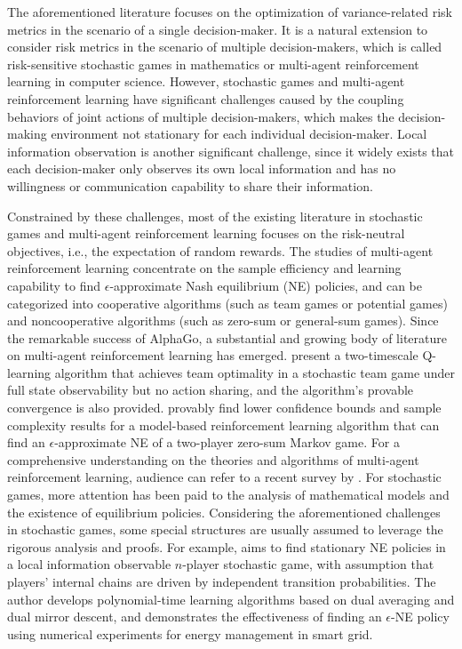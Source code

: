 \documentclass[12pt]{article}
\begin{document}
The aforementioned literature focuses on the optimization of
variance-related risk metrics in the scenario of a single
decision-maker. It is a natural extension to consider risk metrics
in the scenario of multiple decision-makers, which is called
risk-sensitive stochastic games in mathematics or multi-agent
reinforcement learning in computer science. However, stochastic
games and multi-agent reinforcement learning have significant
challenges caused by the coupling behaviors of joint actions of
multiple decision-makers, which makes the decision-making
environment not stationary for each individual decision-maker. Local
information observation is another significant challenge, since it
widely exists that each decision-maker only observes its own local
information and has no willingness or communication capability to
share their information.


Constrained by these challenges, most of the existing literature in
stochastic games and multi-agent reinforcement learning focuses on
the risk-neutral objectives, i.e., the expectation of random
rewards. The studies of multi-agent reinforcement learning
concentrate on the sample efficiency and learning capability to find
$\epsilon$-approximate Nash equilibrium (NE) policies, and can be
categorized into cooperative algorithms (such as team games or
potential games) and noncooperative algorithms (such as zero-sum or
general-sum games). Since the remarkable success of AlphaGo, a
substantial and growing body of literature on multi-agent
reinforcement learning has emerged. \cite{Yongacoglu21} present a
two-timescale Q-learning algorithm that achieves team optimality in
a stochastic team game under full state observability but no action
sharing, and the algorithm's provable convergence is also provided.
\cite{Yan24} provably find lower confidence bounds and sample
complexity results for a model-based reinforcement learning
algorithm that can find an $\epsilon$-approximate NE of a two-player
zero-sum Markov game. For a comprehensive understanding on the
theories and algorithms of multi-agent reinforcement learning,
audience can refer to a recent survey by \cite{Zhang21}. For
stochastic games, more attention has been paid to the analysis of
mathematical models and the existence of equilibrium policies.
Considering the aforementioned challenges in stochastic games, some
special structures are usually assumed to leverage the rigorous
analysis and proofs. For example, \cite{Etesami24} aims to find
stationary NE policies in a local information observable $n$-player
stochastic game, with assumption that players' internal chains are
driven by independent transition probabilities. The author develops
polynomial-time learning algorithms based on dual averaging and dual
mirror descent, and demonstrates the effectiveness of finding an
$\epsilon$-NE policy using numerical experiments for energy
management in smart grid.
\end{document}
